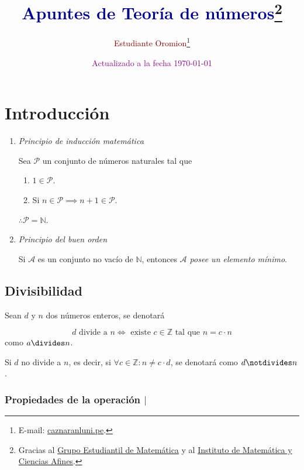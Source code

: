 \documentclass[oneside,a5paper]{memoir}
\author{\textcolor{DarkRed}{Estudiante Oromion}\thanks{E-mail: {\href{mailto:caznaranl@uni.pe}{caznaranl\MVAt uni.pe}}.}}
\title{\textcolor{DarkBlue}{Apuntes de Teoría de números}\thanks{Gracias al \href{https://web.facebook.com/GEMFCUNI/}{Grupo Estudiantil de Matemática} y al \href{http://imca.edu.pe/portal/index.php/es/}{Instituto de Matemática y Ciencias Afines}.}}
\date{\textcolor{DarkMagenta}{Actualizado a la fecha \today}}
\begin{document}
\maketitle
\chapter{Introducción}%

\begin{enumerate}[font={\bfseries},label={\roman*.}]

\item\label{pr:1} \emph{Principio de inducción matemática}
	
Sea $\mathcal{P}$ un conjunto de números naturales tal que

\begin{enumerate}
	\item $1\in\mathcal{P}$.
	\item Si $n\in\mathcal{P}\implies n+1\in\mathcal{P}$.
\end{enumerate}

$\therefore \boxed{\mathcal{P}=\mathbb{N}}$.

\item\label{pr:2} \emph{Principio del buen orden}

Si $\mathcal{A}$ es un conjunto no vacío de $\mathbb{N}$, entonces \emph{$\mathcal{A}$ posee un elemento mínimo}.

\end{enumerate}

\section{Divisibilidad}

\begin{definition}\label{def:1.1}

Sean $d$ y $n$ dos números enteros, se denotará

\[\boxed{d\text{ divide a }n\iff\text{ existe }c\in\mathbb{Z}\text{ tal que }n=c\cdot n}\]
como $a\divides n$.

\noindent
Si $d$ no divide a $n$, es decir, si $\forall c\in\mathbb{Z}\colon n\neq c\cdot d$, se denotará como $d\notdivides n$.

\end{definition}

\subsection{Propiedades de la operación $|$}
\end{document}
